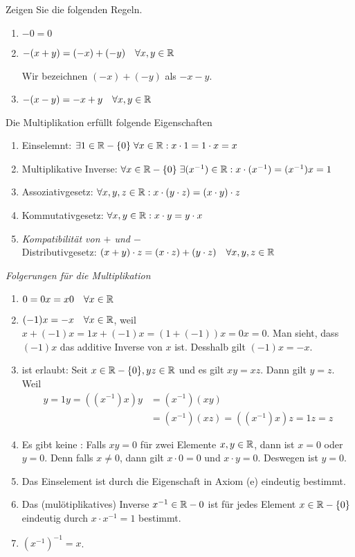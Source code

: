 \begin{imp-ex}
  Zeigen Sie die folgenden Regeln.
  \begin{enumerate}
    \item $-0=0$
    \item $-(x+y)=(-x)+(-y)  \quad \forall x,y \in \mathbb{R}$

    Wir bezeichnen $(-x)+(-y)$ als $-x-y$.
    \item $-(x-y)=-x+y \quad \forall x,y \in \mathbb{R}$
  \end{enumerate}
\end{imp-ex}

Die Multiplikation erfüllt folgende Eigenschaften
\begin{enumerate}
  \item Einselemnt: $\exists 1 \in \mathbb{R} - \{0\} \; \forall x \in \mathbb{R}: x \cdot 1 = 1 \cdot x = x$
  \item Multiplikative Inverse: $\forall x \in \mathbb{R} - \{0\} \; \exists (x^{-1}) \in \mathbb{R}: x \cdot (x^{-1}) = (x^{-1})x = 1$
  \item  Assoziativgesetz: $\forall x,y,z \in \mathbb{R}: x \cdot (y \cdot z) = (x \cdot y) \cdot z$
  \item Kommutativgesetz: $\forall x,y \in \mathbb{R}: x \cdot y = y \cdot x$
  \item \emph{Kompatibilität von $+$ und $-$} \\
  Distributivgesetz: $(x+y)\cdot z = (x \cdot z) + (y \cdot z) \quad \forall x,y,z \in \mathbb{R}$
\end{enumerate}

\emph{Folgerungen für die Multiplikation}
\begin{enumerate}
  \item $0 = 0x = x0 \quad \forall x \in \mathbb{R}$
  \item $(-1)x = -x \quad \forall x \in \mathbb{R}$, weil $x + (-1) x = 1x + (-1)x = (1+(-1))x = 0x = 0$. Man sieht, dass $(-1)x$ das additive Inverse von $x$ ist. Desshalb gilt $(-1)x = -x$.
  \item {} ist erlaubt: Seit $x \in \mathbb{R} - \{0\}, yz \in \mathbb{R}$ und es gilt $xy=xz$. Dann gilt $y=z$. Weil
  \[
  \begin{aligned}
   y=1y=((x^{-1})x)y&=(x^{-1})(xy)\\
   &=(x^{-1})(xz)=((x^{-1})x)z=1z = z
  \end{aligned}
  \]
  \item Es gibt keine : Falls $xy=0$ für zwei Elemente $x,y \in \mathbb{R}$, dann ist $x=0$ oder $y=0$. Denn falls $x \neq 0$, dann gilt $x \cdot 0 = 0$ und $x \cdot y = 0$. Deswegen ist $y=0$.
  \item Das Einselement ist durch die Eigenschaft in Axiom (e) eindeutig bestimmt.
  \item Das (mulötiplikatives) Inverse $x^{-1} \in \mathbb{R} - {0}$  ist für jedes Element $x \in \mathbb{R} - \{0\}$ eindeutig durch $x \cdot x^{-1} = 1$ bestimmt.
  \item $(x^{-1})^{-1} = x$.
\end{enumerate}


